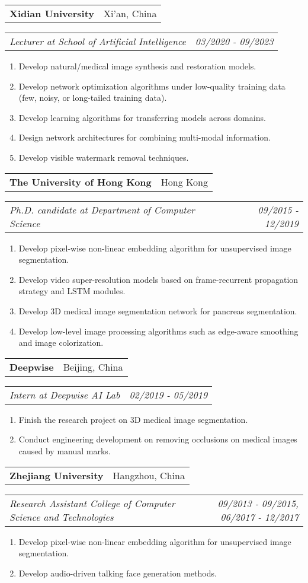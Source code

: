 \documentclass[a4paper,36pt]{article}
\makeatletter
\newcommand{\resumeItemWithoutTitle}[1]{
  \item\justifying\small{
    {#1 \vspace{-2pt}}
  }
}
\newcommand{\resumeSubheading}[2]{
  \item
    \begin{tabular*}{0.97\textwidth}{l@{\extracolsep{\fill}}r}
      \textbf{#1} & #2 \\
    \end{tabular*}%
}
\newcommand{\resumeSubheadingWithoutItem}[2]{
    \begin{tabular*}{0.97\textwidth}{l@{\extracolsep{\fill}}r}
      \textit{#1} & \textit{#2} \\
    \end{tabular*}
}
\newcommand{\resumeSubHeadingEnumStart}{\begin{enumerate}[leftmargin=*]}
\newcommand{\resumeSubHeadingEnumEnd}{\end{enumerate}}
\makeatother
\begin{document}
    \resumeSubheading{Xidian University}{Xi'an, China}
    \resumeSubheadingWithoutItem{Lecturer at School of Artificial Intelligence}{03/2020 - 09/2023}\vspace{-8pt}
    \resumeSubHeadingEnumStart
      \resumeItemWithoutTitle{Develop natural/medical image synthesis and restoration models.}
      \resumeItemWithoutTitle{Develop network optimization algorithms under low-quality training data (few, noisy, or long-tailed training data).}
      \resumeItemWithoutTitle{Develop learning algorithms for transferring models across domains.}
      \resumeItemWithoutTitle{Design network architectures for combining multi-modal information.}
      \resumeItemWithoutTitle{Develop visible watermark removal techniques.}
    \resumeSubHeadingEnumEnd

    \resumeSubheading{The University of Hong Kong}{Hong Kong}
    \resumeSubheadingWithoutItem{Ph.D. candidate at Department of Computer Science}{09/2015 - 12/2019}\vspace{-8pt}
    \resumeSubHeadingEnumStart
      \resumeItemWithoutTitle{Develop pixel-wise non-linear embedding algorithm for unsupervised image segmentation.}
      \resumeItemWithoutTitle{Develop video super-resolution models based on frame-recurrent propagation strategy and LSTM modules.}
      \resumeItemWithoutTitle{Develop 3D medical image segmentation network for pancreas segmentation.}
      \resumeItemWithoutTitle{Develop low-level image processing algorithms such as edge-aware smoothing and image colorization.}
    \resumeSubHeadingEnumEnd

    \resumeSubheading{Deepwise}{Beijing, China}
    \resumeSubheadingWithoutItem{Intern at Deepwise AI Lab}{02/2019 - 05/2019}\vspace{-8pt}
    \resumeSubHeadingEnumStart
      \resumeItemWithoutTitle{Finish the research project on 3D medical image segmentation.}
      \resumeItemWithoutTitle{Conduct engineering development on removing occlusions on medical images caused by manual marks.}
    \resumeSubHeadingEnumEnd

    \resumeSubheading{Zhejiang University}{Hangzhou, China}
    \resumeSubheadingWithoutItem{Research Assistant College of Computer Science and Technologies}{09/2013 - 09/2015, 06/2017 - 12/2017}\vspace{-8pt}
    \resumeSubHeadingEnumStart
      \resumeItemWithoutTitle{Develop pixel-wise non-linear embedding algorithm for unsupervised image segmentation.}
      \resumeItemWithoutTitle{Develop audio-driven talking face generation methods.}
    \resumeSubHeadingEnumEnd
\end{document}
